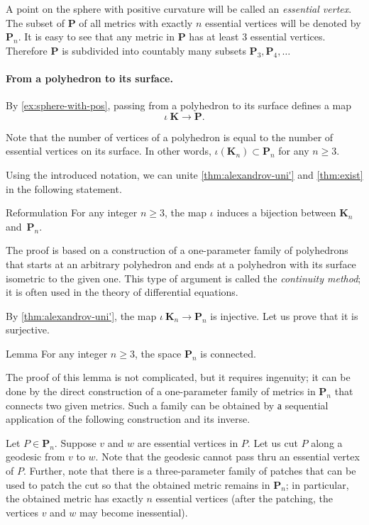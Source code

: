 A point on the sphere with positive curvature will be called an \emph{essential vertex}.
The subset of $\mathbf{P}$ of all metrics with exactly $n$ essential vertices will be denoted by $\mathbf{P}_n$.
It is easy to see that any metric in $\mathbf{P}$ has at least 3 essential vertices.
Therefore $\mathbf{P}$ is subdivided into countably many subsets
 $\mathbf{P}_3,\mathbf{P}_4,\dots$

\paragraph{From a polyhedron to its surface.}

By \ref{ex:sphere-with-pos}, passing from a polyhedron to its surface defines a map
\[\iota\:\mathbf{K}\to \mathbf{P}.\]

Note that the number of vertices of a polyhedron is equal to the number of essential vertices on its surface.
In other words, $\iota(\mathbf{K}_n)\subset \mathbf{P}_n$ for any $n\ge 3$.

Using the introduced notation, we can unite \ref{thm:alexandrov-uni'} and \ref{thm:exist} in the following statement.

\begin{thm}{Reformulation}
For any integer $n\ge 3$,
the map $\iota$ induces a bijection between $\mathbf{K}_n$ and~$\mathbf{P}_n$.
\end{thm}

The proof is based on a construction of a one-parameter family of polyhedrons that starts at an arbitrary polyhedron
and ends at a polyhedron with its surface isometric to the given one.
This type of argument is called the \emph{continuity method}; it is often used in the theory of differential equations.


By \ref{thm:alexandrov-uni'}, the map $\iota\:\mathbf{K}_n\to\mathbf{P}_n$ is injective.
Let us prove that it is surjective.

\begin{thm}{Lemma}
For any integer $n\ge 3$, the space $\mathbf{P}_n$ is connected.
\end{thm}

The proof of this lemma is not complicated, but it requires ingenuity;
it can be done by the direct construction of a one-parameter family of metrics in $\mathbf{P}_n$ that connects two given metrics.
Such a family can be obtained by а sequential application of the following construction and its inverse.

Let $P\in\mathbf{P}_n$.
Suppose $v$ and $w$ are essential vertices in $P$.
Let us cut $P$ along a geodesic from $v$ to $w$.
Note that the geodesic cannot pass thru an essential vertex of $P$.
Further, note that there is a three-parameter family of patches that can be used to patch the cut so that the obtained metric remains in $\mathbf{P}_n$;
in particular, the obtained metric has exactly $n$ essential vertices (after the patching, the vertices $v$ and $w$ may become inessential).


